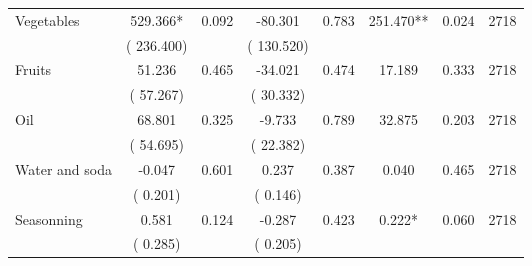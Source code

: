 \begin{tabular}{l*{7}{c}}
 Vegetables       &            529.366*       &        0.092  &            -80.301       &        0.783  &            251.470**       &              0.024 &  2718 \\ 
                       &       (     236.400)             &                               &       (     130.520)                     &                               &                                               &                                &                      \\ 

 Fruits       &             51.236       &        0.465  &            -34.021       &        0.474  &             17.189       &              0.333 &  2718 \\ 
                       &       (      57.267)             &                               &       (      30.332)                     &                               &                                               &                                &                      \\ 

 Oil       &             68.801       &        0.325  &             -9.733       &        0.789  &             32.875       &              0.203 &  2718 \\ 
                       &       (      54.695)             &                               &       (      22.382)                     &                               &                                               &                                &                      \\ 

 Water and soda       &             -0.047       &        0.601  &              0.237       &        0.387  &              0.040       &              0.465 &  2718 \\ 
                       &       (       0.201)             &                               &       (       0.146)                     &                               &                                               &                                &                      \\ 

 Seasonning       &              0.581       &        0.124  &             -0.287       &        0.423  &              0.222*       &              0.060 &  2718 \\ 
                       &       (       0.285)             &                               &       (       0.205)                     &                               &                                               &                                &                      \\ 


\end{tabular}
